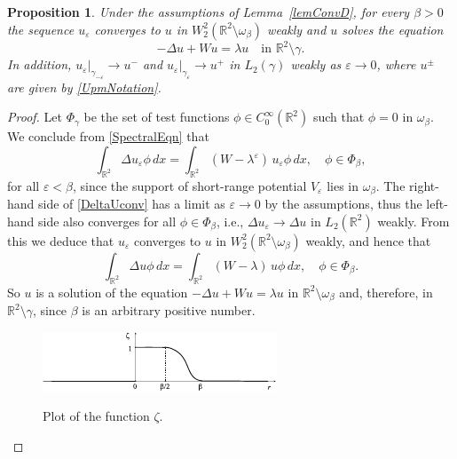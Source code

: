 \documentclass[reqno]{amsart}
\theoremstyle{plain}
\newtheorem{prop}{Proposition}
\numberwithin{equation}{section}
\newcommand{\Real}{\mathbb R}
\newcommand{\eps}{\varepsilon}
\begin{document}
\begin{prop}
  Under the assumptions of Lemma~\ref{lemConvD}, for every $\beta>0$ the sequence $u_\eps$ converges to $u$ in $W_2^2(\Real^2\setminus \omega_\beta)$ weakly and $u$ solves the equation
  \begin{equation*}
    -\Delta u+Wu=\lambda u \quad \text{in  } \Real^2\setminus \gamma.
  \end{equation*}
 In addition,  $u_\eps|_{\gamma_{-\eps}}\to u^-$ and $u_\eps|_{\gamma_{\eps}}\to u^+$ in $L_2(\gamma)$ weakly as $\eps\to 0$, where $u^\pm$ are given by \eqref{UpmNotation}.
\end{prop}
\begin{proof}
  Let $\Phi_\gamma$ be the set of test functions $\phi\in C_0^\infty(\Real^2)$ such that $\phi=0$ in $\omega_\beta$. We conclude from \eqref{SpectralEqn} that
  \begin{equation}\label{DeltaUconv}
    \int_{\Real^2} \Delta u_\eps\phi\,dx=\int_{\Real^2} (W-\lambda^\eps)\,u_\eps\phi\,dx, \quad\phi\in \Phi_\beta,
  \end{equation}
for all $\eps<\beta$, since the support of short-range potential $V_\eps$ lies in $\omega_\beta$. The right-hand side of \eqref{DeltaUconv} has a limit as $\eps\to 0$ by the assumptions, thus the left-hand side also converges for all $\phi\in \Phi_\beta$, i.e., $\Delta u_\eps\to \Delta u$ in $L_2(\Real^2)$ weakly. From this we deduce that $u_\eps$ converges to $u$ in  $W_2^2(\Real^2\setminus \omega_\beta)$ weakly, and hence that
  \begin{equation}\label{DeltaUconv}
    \int_{\Real^2} \Delta u\phi\,dx=\int_{\Real^2} (W-\lambda)\,u\phi\,dx, \quad\phi\in \Phi_\beta.
  \end{equation}
So $u$ is a solution of the equation  $-\Delta u+Wu=\lambda u$
in $\Real^2\setminus \omega_\beta$  and, therefore,  in $\Real^2\setminus \gamma$,
since $\beta$ is an arbitrary positive number.

\begin{figure}[b]
  \centering
  \includegraphics[scale=1.8]{JumpFunction}\\
  \caption{Plot of the function $\zeta$.}\label{FigPlotZeta}
\end{figure}


\end{proof}
\end{document}
